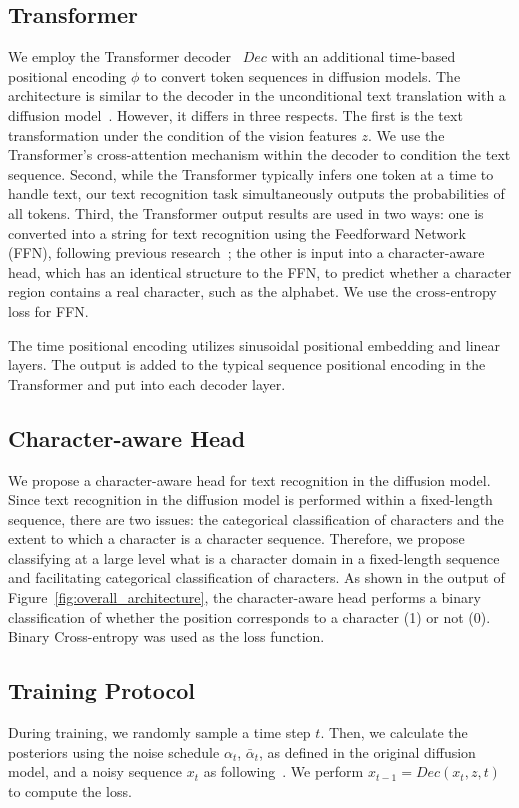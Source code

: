 \documentclass{article}
\begin{document}
\subsection{Transformer}
We employ the Transformer decoder~\cite{vaswani2017transformer} $Dec$ with an additional time-based positional encoding $\phi$ to convert token sequences in diffusion models.
The architecture is similar to the decoder in the unconditional text translation with a diffusion model~\cite{Hoogeboom2021argmax}.
However, it differs in three respects.
The first is the text transformation under the condition of the vision features $z$.
We use the Transformer's cross-attention mechanism within the decoder to condition the text sequence.
Second, while the Transformer typically infers one token at a time to handle text, our text recognition task simultaneously outputs the probabilities of all tokens.
Third, the Transformer output results are used in two ways: one is converted into a string for text recognition using the Feedforward Network (FFN), following previous research~\cite{bautista2022parseq}; the other is input into a character-aware head, which has an identical structure to the FFN, to predict whether a character region contains a real character, such as the alphabet.
We use the cross-entropy loss for FFN.

The time positional encoding utilizes sinusoidal positional embedding and linear layers. The output is added to the typical sequence positional encoding in the Transformer and put into each decoder layer.


\subsection{Character-aware Head}
We propose a character-aware head for text recognition in the diffusion model.
Since text recognition in the diffusion model is performed within a fixed-length sequence, there are two issues: the categorical classification of characters and the extent to which a character is a character sequence.
Therefore, we propose classifying at a large level what is a character domain in a fixed-length sequence and facilitating categorical classification of characters.
As shown in the output of Figure~\ref{fig:overall_architecture}, the character-aware head performs a binary classification of whether the position corresponds to a character (1) or not (0).
Binary Cross-entropy was used as the loss function.

\subsection{Training Protocol}
During training, we randomly sample a time step $t$.
Then, we calculate the posteriors using the noise schedule $\alpha_{t}$, $\bar{\alpha}_{t}$, as defined in the original diffusion model, and a noisy sequence $x_{t}$ as following~\cite{Hoogeboom2021argmax}.
We perform $x_{t-1} = Dec(x_{t}, z, t)$ to compute the loss.
\end{document}
